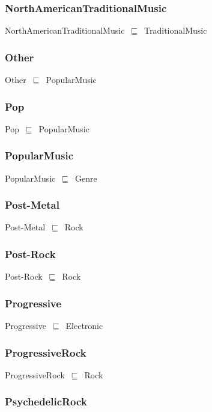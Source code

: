 \documentclass{article}
\begin{document}
\subsubsection*{NorthAmericanTraditionalMusic}

NorthAmericanTraditionalMusic~\ensuremath{\sqsubseteq}~TraditionalMusic~

\subsubsection*{Other}

Other~\ensuremath{\sqsubseteq}~PopularMusic~

\subsubsection*{Pop}

Pop~\ensuremath{\sqsubseteq}~PopularMusic~

\subsubsection*{PopularMusic}

PopularMusic~\ensuremath{\sqsubseteq}~Genre~

\subsubsection*{Post-Metal}

Post-Metal~\ensuremath{\sqsubseteq}~Rock~

\subsubsection*{Post-Rock}

Post-Rock~\ensuremath{\sqsubseteq}~Rock~

\subsubsection*{Progressive}

Progressive~\ensuremath{\sqsubseteq}~Electronic~

\subsubsection*{ProgressiveRock}

ProgressiveRock~\ensuremath{\sqsubseteq}~Rock~

\subsubsection*{PsychedelicRock}
\end{document}
